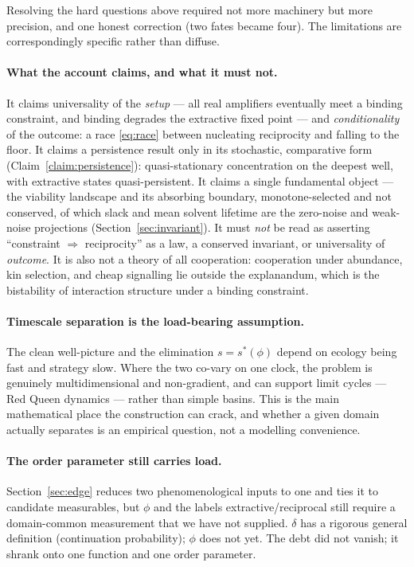 \documentclass[11pt]{article}
\theoremstyle{plain}
\theoremstyle{definition}
\begin{document}
Resolving the hard questions above required not more machinery but more precision, and one honest correction (two fates became four). The limitations are correspondingly specific rather than diffuse.

\paragraph{What the account claims, and what it must not.} It claims universality of the \emph{setup} --- all real amplifiers eventually meet a binding constraint, and binding degrades the extractive fixed point --- and \emph{conditionality} of the outcome: a race \eqref{eq:race} between nucleating reciprocity and falling to the floor. It claims a persistence result only in its stochastic, comparative form (Claim~\ref{claim:persistence}): quasi-stationary concentration on the deepest well, with extractive states quasi-persistent. It claims a single fundamental object --- the viability landscape and its absorbing boundary, monotone-selected and not conserved, of which slack and mean solvent lifetime are the zero-noise and weak-noise projections (Section~\ref{sec:invariant}). It must \emph{not} be read as asserting ``constraint $\Rightarrow$ reciprocity'' as a law, a conserved invariant, or universality of \emph{outcome}. It is also not a theory of all cooperation: cooperation under abundance, kin selection, and cheap signalling lie outside the explanandum, which is the bistability of interaction structure under a binding constraint.

\paragraph{Timescale separation is the load-bearing assumption.} The clean well-picture and the elimination $s = s^\ast(\phi)$ depend on ecology being fast and strategy slow. Where the two co-vary on one clock, the problem is genuinely multidimensional and non-gradient, and can support limit cycles --- Red Queen dynamics --- rather than simple basins. This is the main mathematical place the construction can crack, and whether a given domain actually separates is an empirical question, not a modelling convenience.

\paragraph{The order parameter still carries load.} Section~\ref{sec:edge} reduces two phenomenological inputs to one and ties it to candidate measurables, but $\phi$ and the labels extractive/reciprocal still require a domain-common measurement that we have not supplied. $\delta$ has a rigorous general definition (continuation probability); $\phi$ does not yet. The debt did not vanish; it shrank onto one function and one order parameter.
\end{document}
